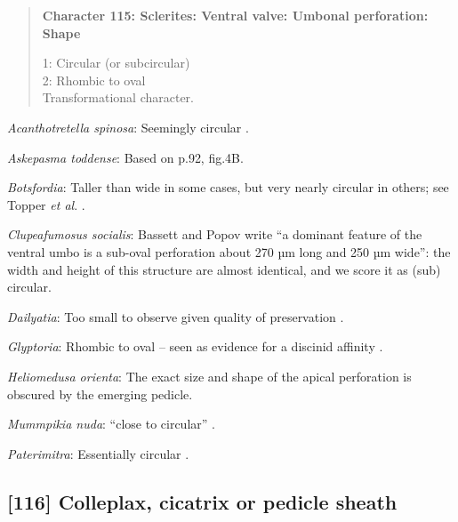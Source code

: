 \documentclass[openany]{book}
\theoremstyle{definition}
\theoremstyle{definition}
\theoremstyle{definition}
\theoremstyle{remark}
\begin{document}
\begin{quote}
\textbf{Character 115: Sclerites: Ventral valve: Umbonal perforation:
Shape}

1: Circular (or subcircular)\\
2: Rhombic to oval\\
Transformational character.
\end{quote}

\hypertarget{Acanthotretella_spinosa-coding-115}{}
\emph{Acanthotretella spinosa}: Seemingly circular
\citep{Zhang2011Anobolellate}.

\hypertarget{Askepasma_toddense-coding-115}{}
\emph{Askepasma toddense}: Based on p.92, fig.4B.

\hypertarget{Botsfordia-coding-115}{}
\emph{Botsfordia}: Taller than wide in some cases, but very nearly
circular in others; see Topper \emph{et al}.
\citeyearpar{Topper2013Reappraisalof}.

\hypertarget{Clupeafumosus_socialis-coding-115}{}
\emph{Clupeafumosus socialis}: Bassett and Popov write ``a dominant
feature of the ventral umbo is a sub-oval perforation about 270 µm long
and 250 µm wide'': the width and height of this structure are almost
identical, and we score it as (sub) circular.

\hypertarget{Dailyatia-coding-115}{}
\emph{Dailyatia}: Too small to observe given quality of preservation
\citep{Holmer2006Aspinose}.

\hypertarget{Glyptoria-coding-115}{}
\emph{Glyptoria}: Rhombic to oval -- seen as evidence for a discinid
affinity \citep{Chen2007Reinterpretationof}.

\hypertarget{Heliomedusa_orienta-coding-115}{}
\emph{Heliomedusa orienta}: The exact size and shape of the apical
perforation is obscured by the emerging pedicle.

\hypertarget{Mummpikia_nuda-coding-115}{}
\emph{Mummpikia nuda}: ``close to circular''
\citep{Holmer2018Evolutionarysignificance}.

\hypertarget{Paterimitra-coding-115}{}
\emph{Paterimitra}: Essentially circular \citep[fig.
4]{Holmer2009Theenigmatic}.

\subsection*{{[}116{]} Colleplax, cicatrix or pedicle
sheath}\label{colleplax-cicatrix-or-pedicle-sheath}
\end{document}
